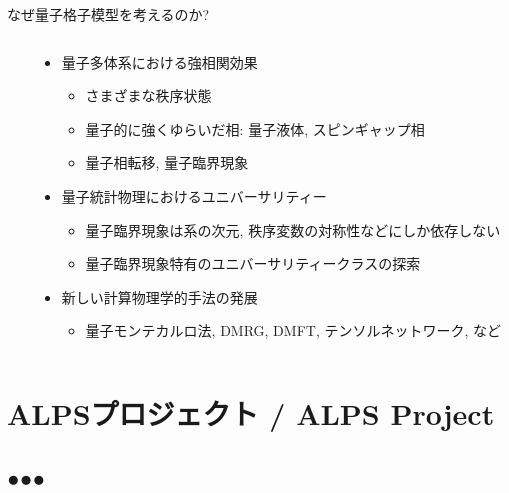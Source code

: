 \begin{frame}[t,fragile]{なぜ量子格子模型を考えるのか?}
\begin{columns}[T]
\begin{column}{.2\textwidth}
    \end{column}
    \begin{column}{.8\textwidth}
      \begin{itemize}
      \item 量子多体系における強相関効果
        \begin{itemize}
        \item さまざまな秩序状態
        \item 量子的に強くゆらいだ相: 量子液体, スピンギャップ相
        \item 量子相転移, 量子臨界現象
        \end{itemize}
      \item 量子統計物理におけるユニバーサリティー
        \begin{itemize}
        \item 量子臨界現象は系の次元, 秩序変数の対称性などにしか依存しない
        \item 量子臨界現象特有のユニバーサリティークラスの探索
        \end{itemize}
      \item 新しい計算物理学的手法の発展
        \begin{itemize}
        \item 量子モンテカルロ法, DMRG, DMFT, テンソルネットワーク, など
        \end{itemize}
      \end{itemize}
    \end{column}
  \end{columns}
\end{frame}

\section{ALPSプロジェクト / ALPS Project}
\subsection*{{\protect\color{red}●}{\protect\color{blue}●}{\protect\color{green}●}}

